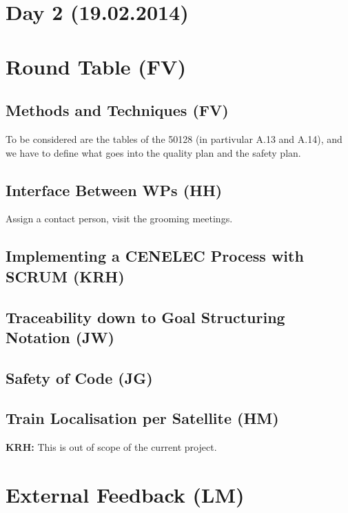 \documentclass[a4paper,german]{article}
\begin{document}
\section*{Day 2 (19.02.2014)}
\label{sec:day-1-18.02.2014}

\section{Round Table (FV)}
\label{sec:round-table-fred}

\subsection{Methods and Techniques (FV)}
\label{sec:methods-techniques}

To be considered are the tables of the 50128 (in partivular A.13 and
A.14), and we have to define what goes into the quality plan and the
safety plan. 

\subsection{Interface Between WPs  (HH)}
\label{sec:interf-betw-wps}

Assign a contact person, visit the grooming meetings.

\subsection{Implementing a CENELEC Process with SCRUM (KRH)}
\label{sec:impl-cenel-proc}


\subsection{Traceability down to Goal Structuring Notation (JW)}
\label{sec:trac-down-goal}

\subsection{Safety of Code (JG)}
\label{sec:safety-code-jens}

\subsection{Train Localisation per Satellite (HM)}
\label{sec:train-local-per}

\textbf{KRH:} This is out of scope of the current project. 

\section{External Feedback (LM)}
\label{sec:external-feedback-lm}
\end{document}
